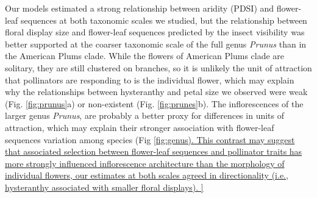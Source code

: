 \documentclass{article}[12pt]
\begin{document}
{%


Our models estimated a strong relationship between aridity (PDSI) and flower-leaf sequences at both taxonomic scales we studied, but the relationship between floral display size and flower-leaf sequences predicted by the insect visibility was better supported at the coarser taxonomic scale of the full genus \emph{Prunus} than in the American Plums clade. While the flowers of American Plums clade are solitary, they are still clustered on branches, so it is unlikely the unit of attraction that pollinators are responding to is the individual flower, which may explain why the relationships between hysteranthy and petal size we observed were weak (Fig. \ref{fig:prunus}a) or non-existent (Fig. \ref{fig:prunes}b). The inflorescences of the larger genus \emph{Prunus}, are probably a better proxy for differences in units of attraction, which may explain their stronger association with flower-leaf sequences variation among species (Fig \ref{fig:genus). This contrast may suggest that associated selection between flower-leaf sequences and pollinator traits has more strongly influenced inflorescence architecture than the morphology of individual flowers, our estimates at both scales agreed in directionality (i.e., hysteranthy associated with smaller floral displays). 

}}
\end{document}
